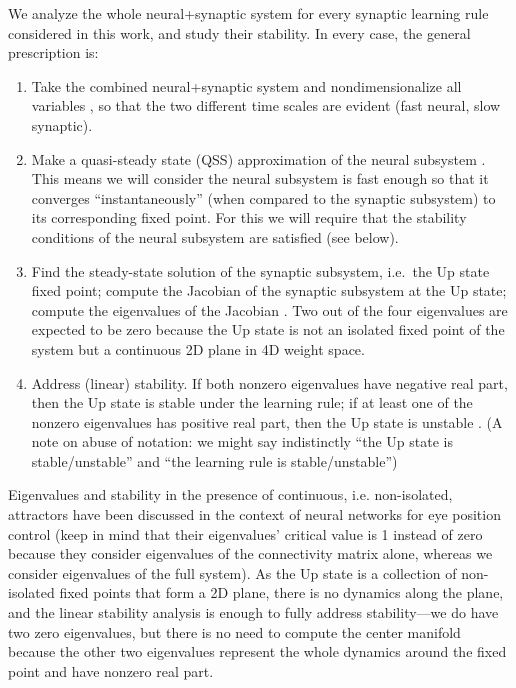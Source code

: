 \documentclass[
twocolumn,
]{article}
\begin{document}
We analyze the whole neural+synaptic system for every synaptic learning rule considered in this work, and study their stability. In every case, the general prescription is:
\begin{enumerate}
\item Take the combined neural+synaptic system and nondimensionalize all variables \cite[see Sections 1.2 and 1.4 of Ref.\ ][]{Keener1998}\cite[see Section 3.5 of Ref.\ ][]{Strogatz2018}, so that the two different time scales are evident (fast neural, slow synaptic).
\item Make a quasi-steady state (QSS) approximation of the neural subsystem \cite{Keener1998,Strogatz2018}. This means we will consider the neural subsystem is fast enough so that it converges ``instantaneously'' (when compared to the synaptic subsystem) to its corresponding fixed point. 
For this we will require that the stability conditions of the neural subsystem are satisfied (see below).
\item Find the steady-state solution of the synaptic subsystem, i.e.\ the Up state fixed point; compute the Jacobian of the synaptic subsystem at the Up state; compute the eigenvalues of the Jacobian \cite{Strogatz2018,Wiggins1996}. Two out of the four eigenvalues are expected to be zero because the Up state is not an isolated fixed point of the system but a continuous 2D plane in 4D weight space.
\item Address (linear) stability. If both nonzero eigenvalues have negative real part, then the Up state is stable under the learning rule; if at least one of the nonzero eigenvalues has positive real part, then the Up state is unstable \cite{Strogatz2018,Wiggins1996}. (A note on abuse of notation: we might say indistinctly ``the Up state is stable/unstable'' and ``the learning rule is stable/unstable'')
\end{enumerate}

Eigenvalues and stability in the presence of continuous, i.e. non-isolated, attractors have been discussed in the context of neural networks for eye position control \cite{Seung1996,Seung1998} (keep in mind that their eigenvalues' critical value is 1 instead of zero because they consider eigenvalues of the connectivity matrix alone, whereas we consider eigenvalues of the full system). As the Up state is a collection of non-isolated fixed points that form a 2D plane, there is no dynamics along the plane, and the linear stability analysis is enough to fully address stability---we do have two zero eigenvalues, but there is no need to compute the center manifold \cite{Wiggins1996} because the other two eigenvalues represent the whole dynamics around the fixed point and have nonzero real part.
\end{document}
